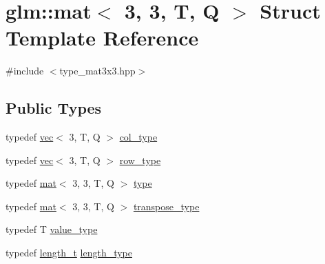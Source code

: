 \hypertarget{structglm_1_1mat_3_013_00_013_00_01_t_00_01_q_01_4}{}\section{glm\+:\+:mat$<$ 3, 3, T, Q $>$ Struct Template Reference}
\label{structglm_1_1mat_3_013_00_013_00_01_t_00_01_q_01_4}


{\ttfamily \#include $<$type\+\_\+mat3x3.\+hpp$>$}

\subsection*{Public Types}
\begin{DoxyCompactItemize}
\item 
typedef \mbox{\hyperlink{structglm_1_1vec}{vec}}$<$ 3, T, Q $>$ \mbox{\hyperlink{structglm_1_1mat_3_013_00_013_00_01_t_00_01_q_01_4_a4d84bef3685131dbb0ac43cac0a3b147}{col\+\_\+type}}
\item 
typedef \mbox{\hyperlink{structglm_1_1vec}{vec}}$<$ 3, T, Q $>$ \mbox{\hyperlink{structglm_1_1mat_3_013_00_013_00_01_t_00_01_q_01_4_aa7593e64ea44bcccb91580e6f6a45110}{row\+\_\+type}}
\item 
typedef \mbox{\hyperlink{structglm_1_1mat}{mat}}$<$ 3, 3, T, Q $>$ \mbox{\hyperlink{structglm_1_1mat_3_013_00_013_00_01_t_00_01_q_01_4_a2e88f5a6401ca62e81b61443f0148ff0}{type}}
\item 
typedef \mbox{\hyperlink{structglm_1_1mat}{mat}}$<$ 3, 3, T, Q $>$ \mbox{\hyperlink{structglm_1_1mat_3_013_00_013_00_01_t_00_01_q_01_4_a4ad9d88cb078cca298550c57bad63c21}{transpose\+\_\+type}}
\item 
typedef T \mbox{\hyperlink{structglm_1_1mat_3_013_00_013_00_01_t_00_01_q_01_4_a1fba85531bcdc9309f4755f30f44dd6f}{value\+\_\+type}}
\item 
typedef \mbox{\hyperlink{namespaceglm_a090a0de2260835bee80e71a702492ed9}{length\+\_\+t}} \mbox{\hyperlink{structglm_1_1mat_3_013_00_013_00_01_t_00_01_q_01_4_ae1b8524f20936516a48384a2841b5b9d}{length\+\_\+type}}
\end{DoxyCompactItemize}
